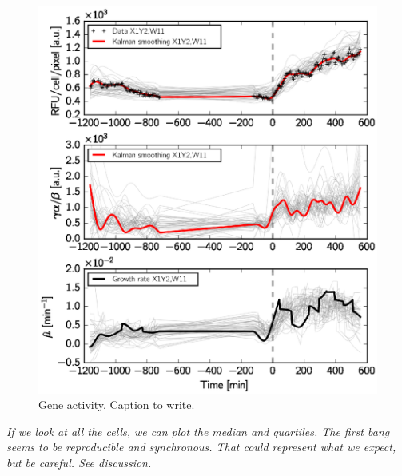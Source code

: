 \begin{figure}[h!]
\centering
\includegraphics[scale=1]{./Fig/gene_activity}
\caption{Gene activity. Caption to write.}
\label{fig:gene_activity}
\end{figure}


\textit{
If we look at all the cells, we can plot the median and quartiles.
The first bang seems to be reproducible and synchronous.
That could represent what we expect, but be careful. See discussion.
}

